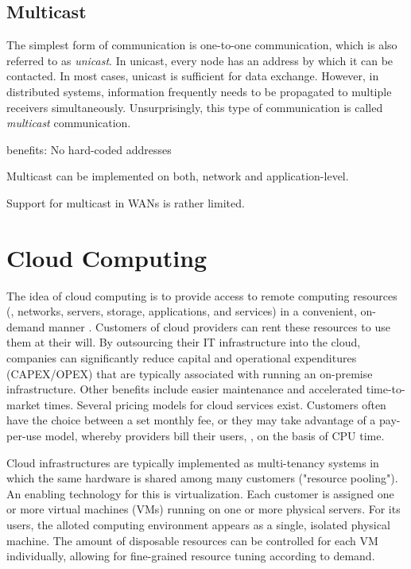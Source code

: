 \subsection{Multicast}
The simplest form of communication is one-to-one communication, which is also referred to as \emph{unicast}. In unicast, every node has an address by which it can be contacted. In most cases, unicast is sufficient for data exchange. However, in distributed systems, information frequently needs to be propagated to multiple receivers simultaneously. Unsurprisingly, this type of communication is called \emph{multicast} communication. 

benefits: No hard-coded addresses

Multicast can be implemented on both, network and application-level.

Support for multicast in WANs is rather limited.

%
%
%
%
%
%
%
%
%
%

\section{Cloud Computing}

The idea of cloud computing is to provide access to remote computing resources  (\eg , networks, servers, storage, applications, and services) in a convenient, on-demand manner \cite{mell2011nist}. Customers of cloud providers can rent these resources to use them at their will. By outsourcing their IT infrastructure into the cloud, companies can significantly reduce capital and operational expenditures (CAPEX/OPEX) that are typically associated with running an on-premise infrastructure. Other benefits include easier maintenance and accelerated time-to-market times. Several pricing models for cloud services exist. Customers often have the choice between a set monthly fee, or they may take advantage of a pay-per-use model, whereby providers bill their users, \eg , on the basis of CPU time.

Cloud infrastructures are typically implemented as multi-tenancy systems in which the same hardware is shared among many customers ("resource pooling"). An enabling technology for this is virtualization. Each customer is assigned one or more virtual machines (VMs) running on one or more physical servers. For its users, the alloted computing environment appears as a single, isolated physical machine. The amount of disposable resources can be controlled for each VM individually, allowing for fine-grained resource tuning according to demand.

